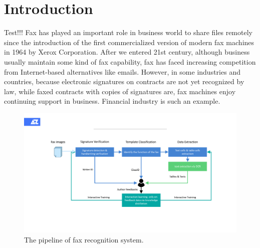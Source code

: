 \documentclass[sigconf]{acmart}
\begin{document}
%


%
\maketitle

\section{Introduction}
Test!!! Fax has played an important role in business world to share files remotely since the introduction of the first commercialized version of modern fax machines in 1964 by Xerox Corporation. After we entered 21st century, although business usually maintain some kind of fax capability, fax has faced increasing competition from Internet-based alternatives like emails. However, in some industries and countries, because electronic signatures on contracts are not yet recognized by law, while faxed contracts with copies of signatures are, fax machines enjoy continuing support in business. Financial industry is such an example.


\begin{figure}[h]
	\centering
	\includegraphics[width=\linewidth]{figure1}
	\caption{The pipeline of fax recognition system. }
	\label{figure1}
\end{figure}
\end{document}
